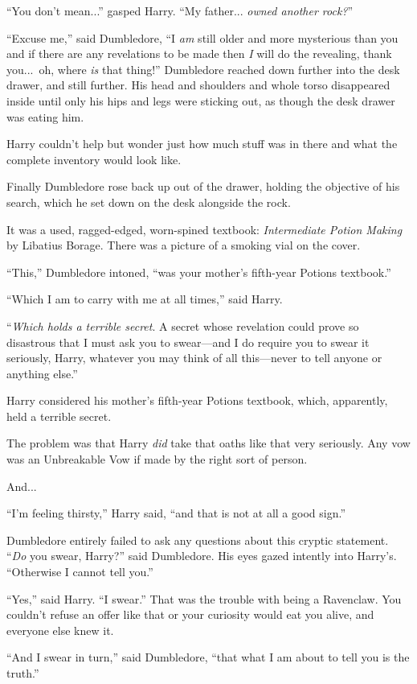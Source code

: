 “You don’t mean...” gasped Harry. “My father... \emph{owned another rock?}”

“Excuse me,” said Dumbledore, “I \emph{am} still older and more mysterious than you and if there are any revelations to be made then \emph{I} will do the revealing, thank you...\ oh, where \emph{is} that thing!” Dumbledore reached down further into the desk drawer, and still further. His head and shoulders and whole torso disappeared inside until only his hips and legs were sticking out, as though the desk drawer was eating him.

Harry couldn’t help but wonder just how much stuff was in there and what the complete inventory would look like.

Finally Dumbledore rose back up out of the drawer, holding the objective of his search, which he set down on the desk alongside the rock.

It was a used, ragged-edged, worn-spined textbook: \emph{Intermediate Potion Making} by Libatius Borage. There was a picture of a smoking vial on the cover.

“This,” Dumbledore intoned, “was your mother’s fifth-year Potions textbook.”

“Which I am to carry with me at all times,” said Harry.

“\emph{Which holds a terrible secret}. A secret whose revelation could prove so disastrous that I must ask you to swear—and I do require you to swear it seriously, Harry, whatever you may think of all this—never to tell anyone or anything else.”

Harry considered his mother’s fifth-year Potions textbook, which, apparently, held a terrible secret.

The problem was that Harry \emph{did} take that oaths like that very seriously. Any vow was an Unbreakable Vow if made by the right sort of person.

And...

“I’m feeling thirsty,” Harry said, “and that is not at all a good sign.”

Dumbledore entirely failed to ask any questions about this cryptic statement. “\emph{Do} you swear, Harry?” said Dumbledore. His eyes gazed intently into Harry’s. “Otherwise I cannot tell you.”

“Yes,” said Harry. “I swear.” That was the trouble with being a Ravenclaw. You couldn’t refuse an offer like that or your curiosity would eat you alive, and everyone else knew it.

“And I swear in turn,” said Dumbledore, “that what I am about to tell you is the truth.”

